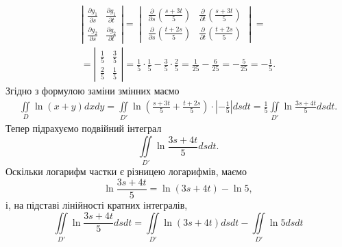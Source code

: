 \begin{example}
\[\begin{array}{c}
\left|
\begin{array}{cc}
\frac{\partial g_1}{\partial s} & \frac{\partial g_1}{\partial t}\\[6pt]
\frac{\partial g_2}{\partial s} & \frac{\partial g_2}{\partial t}
\end{array}
\right|
=
\begin{vmatrix}
\frac{\partial}{\partial s}\left(\frac{s + 3 t}{5}\right) & \frac{\partial }{\partial t}\left(\frac{s + 3 t}{5}\right)\\[6pt]
\frac{\partial }{\partial s}\left(\frac{t + 2 s}{5}\right) & \frac{\partial }{\partial t}\left(\frac{t + 2 s}{5}\right)
\end{vmatrix}
=\\
=
\left|
\begin{array}{cc}
\frac{1}{5} & \frac{3}{5}\\[6pt]
\frac{2}{5} & \frac{1}{5}
\end{array}
\right|
= \frac{1}{5} \cdot \frac{1}{5} - \frac{3}{5}\cdot \frac{2}{5} = \frac{1}{25} - \frac{6}{25} = -\frac{5}{25} = -\frac{1}{5}.
\end{array}
\]
Згідно з формулою заміни змінних маємо
\[
\begin{array}{c}
\iint\limits_D \ln\left(x + y\right) d x d y = \iint\limits_{D'} \ln\left(\frac{s + 3 t}{5} + \frac{t + 2 s}{5}\right) \cdot\left| -\frac{1}{5} \right| d s d t = \frac{1}{5} \iint\limits_{D'} \ln\frac{3 s + 4 t}{5} d s d t.
\end{array}
\]
Тепер підрахуємо подвійний інтеграл
\[
\iint\limits_{D'} \ln\frac{3 s + 4 t}{5} d s d t.
\]
Оскільки логарифм частки є різницею логарифмів, маємо
\[
\ln\frac{3 s + 4 t}{5} = \ln\left(3 s + 4 t\right) - \ln 5,
\]
і, на підставі лінійності кратних інтегралів,
\[
\iint\limits_{D'} \ln\frac{3 s + 4 t}{5} d s d t = \iint\limits_{D'} \ln\left(3 s + 4 t\right) d s d t - \iint\limits_{D'} \ln 5 d s d t
\]


\end{example}
